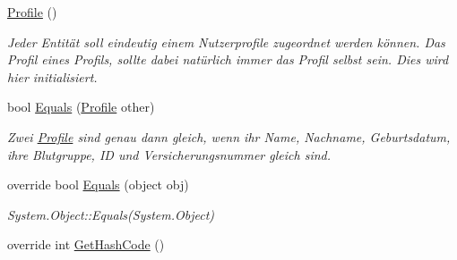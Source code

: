 \begin{CompactItemize}
\item 
\hypertarget{classmy_m_d_1_1_model_1_1_data_model_1_1_profile_06ab5898c6a75576560d1d2b0564dc51}{
\hyperlink{classmy_m_d_1_1_model_1_1_data_model_1_1_profile_06ab5898c6a75576560d1d2b0564dc51}{Profile} ()}
\label{d6/d2c/classmy_m_d_1_1_model_1_1_data_model_1_1_profile_06ab5898c6a75576560d1d2b0564dc51}

\begin{CompactList}\small\item\em Jeder Entit\"{a}t soll eindeutig einem Nutzerprofile zugeordnet werden k\"{o}nnen. Das Profil eines Profils, sollte dabei nat\"{u}rlich immer das Profil selbst sein. Dies wird hier initialisiert. \item\end{CompactList}\item 
bool \hyperlink{classmy_m_d_1_1_model_1_1_data_model_1_1_profile_e81d68dfc88d80965d87424b016e626d}{Equals} (\hyperlink{classmy_m_d_1_1_model_1_1_data_model_1_1_profile}{Profile} other)
\begin{CompactList}\small\item\em Zwei \hyperlink{classmy_m_d_1_1_model_1_1_data_model_1_1_profile}{Profile} sind genau dann gleich, wenn ihr Name, Nachname, Geburtsdatum, ihre Blutgruppe, ID und Versicherungsnummer gleich sind. \item\end{CompactList}\item 
\hypertarget{classmy_m_d_1_1_model_1_1_data_model_1_1_profile_b93f11cf5ba054f230a537cff58bd1c9}{
override bool \hyperlink{classmy_m_d_1_1_model_1_1_data_model_1_1_profile_b93f11cf5ba054f230a537cff58bd1c9}{Equals} (object obj)}
\label{d6/d2c/classmy_m_d_1_1_model_1_1_data_model_1_1_profile_b93f11cf5ba054f230a537cff58bd1c9}

\begin{CompactList}\small\item\em System.Object::Equals(System.Object) \item\end{CompactList}\item 
\hypertarget{classmy_m_d_1_1_model_1_1_data_model_1_1_profile_871aff832c00675bb79db4294f382e58}{
override int \hyperlink{classmy_m_d_1_1_model_1_1_data_model_1_1_profile_871aff832c00675bb79db4294f382e58}{Get\-Hash\-Code} ()}
\label{d6/d2c/classmy_m_d_1_1_model_1_1_data_model_1_1_profile_871aff832c00675bb79db4294f382e58}


\end{CompactItemize}
